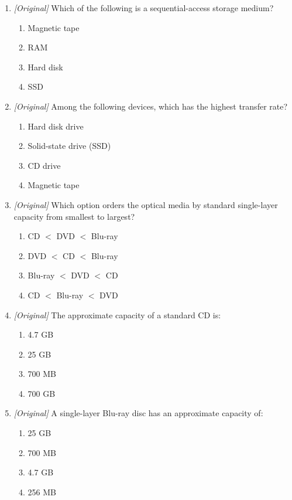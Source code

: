 \begin{enumerate}[label=\textbf{Q\arabic*.}, leftmargin=*]
\begin{enumerate}[label=\Alph*.]
  \end{enumerate}
\item \textit{[Original]} Which of the following is a sequential-access
  storage medium?
  \begin{enumerate}[label=\Alph*.]
    \item Magnetic tape
    \item RAM
    \item Hard disk
    \item SSD
  \end{enumerate}
\item \textit{[Original]} Among the following devices, which has the highest
  transfer rate?
  \begin{enumerate}[label=\Alph*.]
    \item Hard disk drive
    \item Solid-state drive (SSD)
    \item CD drive
    \item Magnetic tape
  \end{enumerate}
\item \textit{[Original]} Which option orders the optical media by standard
  single-layer capacity from smallest to largest?
  \begin{enumerate}[label=\Alph*.]
    \item CD $<$ DVD $<$ Blu-ray
    \item DVD $<$ CD $<$ Blu-ray
    \item Blu-ray $<$ DVD $<$ CD
    \item CD $<$ Blu-ray $<$ DVD
  \end{enumerate}
\item \textit{[Original]} The approximate capacity of a standard CD is:
  \begin{enumerate}[label=\Alph*.]
    \item 4.7 GB
    \item 25 GB
    \item 700 MB
    \item 700 GB
  \end{enumerate}
\item \textit{[Original]} A single-layer Blu-ray disc has an approximate
  capacity of:
  \begin{enumerate}[label=\Alph*.]
    \item 25 GB
    \item 700 MB
    \item 4.7 GB
    \item 256 MB
  \end{enumerate}

\end{enumerate}
